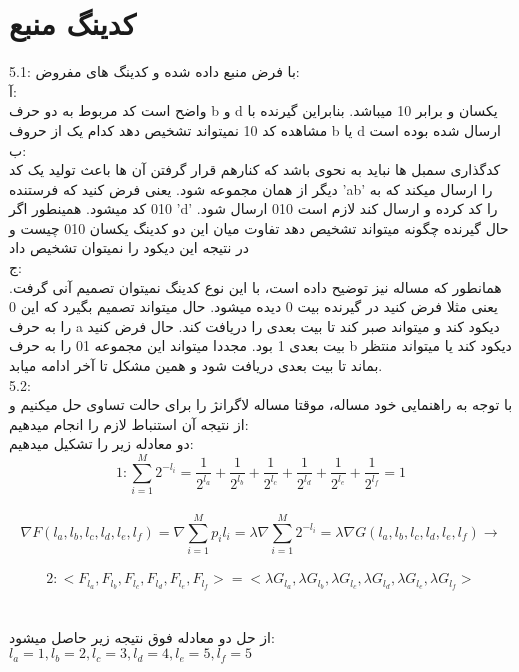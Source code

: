 \newpage
\huge
\section{کدینگ منبع}
\large
5.1:
با فرض منبع داده شده و کدینگ های مفروض:
\\[0.5cm]
آ:
\\
واضح است کد مربوط به دو حرف b و d یکسان و برابر 10 میباشد. بنابراین گیرنده با مشاهده کد 10 نمیتواند تشخیص دهد کدام یک از حروف b یا d ارسال شده بوده است
\\[0.3cm]
ب:
\\
کدگذاری سمبل ها نباید به نحوی باشد که کنارهم قرار گرفتن آن ها باعث تولید یک کد دیگر از همان مجموعه شود. یعنی فرض کنید که فرستنده 'ab' را ارسال میکند که به 010 کد میشود. همینطور اگر 'd' را کد کرده و ارسال کند لازم است 010 ارسال شود. حال گیرنده چگونه میتواند تشخیص دهد تفاوت میان این دو کدینگ یکسان 010 چیست و در نتیجه این دیکود را نمیتوان تشخیص داد
\\[0.3cm]
ج:
\\
همانطور که مساله نیز توضیح داده است، با این نوع کدینگ نمیتوان تصمیم آنی گرفت. یعنی مثلا فرض کنید در گیرنده بیت 0 دیده میشود. حال میتواند تصمیم بگیرد که این 0 را به حرف a دیکود کند و میتواند صبر کند تا بیت بعدی را دریافت کند. حال فرض کنید بیت بعدی 1 بود. مجددا میتواند این مجموعه 01 را به حرف b دیکود کند یا میتواند منتظر بماند تا بیت بعدی دریافت شود و همین مشکل تا آخر ادامه میابد.
\\[0.5cm]
5.2:
\\
با توجه به راهنمایی خود مساله، موقتا مساله لاگرانژ را برای حالت تساوی حل میکنیم و از نتیجه آن استنباط لازم را انجام میدهیم:
\\[0.3cm]
دو معادله زیر را تشکیل میدهیم:
\\
\[{1: } \sum_{i=1}^{M} 2^{-l_{i}} = \frac{1}{2^{l_{a}}} + \frac{1}{2^{l_{b}}} + \frac{1}{2^{l_{c}}} + \frac{1}{2^{l_{d}}} + \frac{1}{2^{l_{e}}} + \frac{1}{2^{l_{f}}} = 1  \]
\\
\[
 \nabla F(l_a,l_b,l_c,l_d,l_e,l_f) =
\nabla \sum_{i=1}^{M} {p}_{i}{l}_i = \lambda \nabla \sum_{i=1}^{M} 2^{-l_{i}} =
\lambda \nabla G(l_a,l_b,l_c,l_d,l_e,l_f)
\rightarrow 
\]
\\
\[
{2:} <F_{l_a}, F_{l_b}, F_{l_c}, F_{l_d}, F_{l_e}, F_{l_f}> = <\lambda G_{l_a},\lambda G_{l_b},\lambda G_{l_c},\lambda G_{l_d},\lambda G_{l_e},\lambda G_{l_f}>
\]
\\
\raggedleft
\\
از حل دو معادله فوق نتیجه زیر حاصل میشود:
\\[0.3cm]
\centering
$l_a=1, l_b=2, l_c=3, l_d=4, l_e=5, l_f=5$
